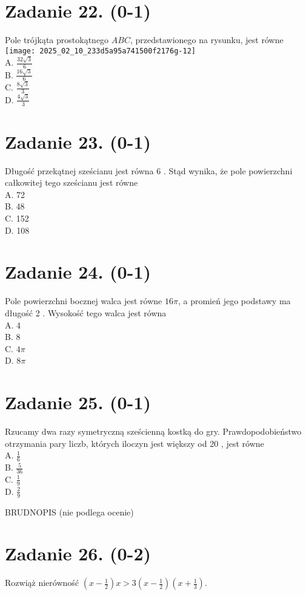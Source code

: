 \documentclass[10pt]{article}
\begin{document}
\section*{Zadanie 22. (0-1)}
Pole trójkąta prostokątnego \(A B C\), przedstawionego na rysunku, jest równe\\
\texttt{[image: 2025\_02\_10\_233d5a95a741500f2176g-12]}\\
A. \(\frac{32 \sqrt{3}}{6}\)\\
B. \(\frac{16 \sqrt{3}}{6}\)\\
C. \(\frac{8 \sqrt{3}}{3}\)\\
D. \(\frac{4 \sqrt{3}}{3}\)

\section*{Zadanie 23. (0-1)}
Długość przekątnej sześcianu jest równa 6 . Stąd wynika, że pole powierzchni całkowitej tego sześcianu jest równe\\
A. 72\\
B. 48\\
C. 152\\
D. 108

\section*{Zadanie 24. (0-1)}
Pole powierzchni bocznej walca jest równe \(16 \pi\), a promień jego podstawy ma długość 2 . Wysokość tego walca jest równa\\
A. 4\\
B. 8\\
C. \(4 \pi\)\\
D. \(8 \pi\)

\section*{Zadanie 25. (0-1)}
Rzucamy dwa razy symetryczną sześcienną kostką do gry. Prawdopodobieństwo otrzymania pary liczb, których iloczyn jest większy od 20 , jest równe\\
A. \(\frac{1}{6}\)\\
B. \(\frac{5}{36}\)\\
C. \(\frac{1}{9}\)\\
D. \(\frac{2}{9}\)

BRUDNOPIS (nie podlega ocenie)\\
\(\qquad\)

\section*{Zadanie 26. (0-2)}
Rozwiąż nierówność \(\left(x-\frac{1}{2}\right) x>3\left(x-\frac{1}{2}\right)\left(x+\frac{1}{3}\right)\).
\end{document}
